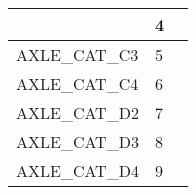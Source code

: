 \documentclass{template/openetcs_article}
\begin{document}
\begin{longtable}{|l|l|l|}
	&	\begin{minipage}[t]{0.10\linewidth} 4 \end{minipage} 
	&	\begin{minipage}[t]{0.50\linewidth} \end{minipage}\\
	\hline
		\begin{minipage}[t]{0.45\linewidth} AXLE\_CAT\_C3 \end{minipage} 
	&	\begin{minipage}[t]{0.10\linewidth} 5 \end{minipage} 
	&	\begin{minipage}[t]{0.50\linewidth} \end{minipage}\\
	\hline
		\begin{minipage}[t]{0.45\linewidth} AXLE\_CAT\_C4 \end{minipage} 
	&	\begin{minipage}[t]{0.10\linewidth} 6 \end{minipage} 
	&	\begin{minipage}[t]{0.50\linewidth} \end{minipage}\\
	\hline
		\begin{minipage}[t]{0.45\linewidth} AXLE\_CAT\_D2 \end{minipage} 
	&	\begin{minipage}[t]{0.10\linewidth} 7 \end{minipage} 
	&	\begin{minipage}[t]{0.50\linewidth} \end{minipage}\\
	\hline
		\begin{minipage}[t]{0.45\linewidth} AXLE\_CAT\_D3 \end{minipage} 
	&	\begin{minipage}[t]{0.10\linewidth} 8 \end{minipage} 
	&	\begin{minipage}[t]{0.50\linewidth} \end{minipage}\\
	\hline
		\begin{minipage}[t]{0.45\linewidth} AXLE\_CAT\_D4 \end{minipage} 
	&	\begin{minipage}[t]{0.10\linewidth} 9 \end{minipage} 
	&	\begin{minipage}[t]{0.50\linewidth} \end{minipage}\\

\end{longtable}
\end{document}
